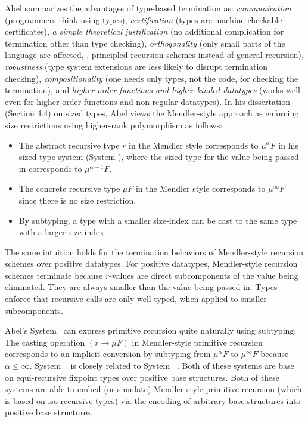 Abel \cite{abel06phd,Abel12talkFICS} summarizes the advantages of
type-based termination as:
\emph{communication} (programmers think using types),
\emph{certification} (types are machine-checkable certificates),
\emph{a simple theoretical justification}
        (no additional complication for termination other than type checking),
\emph{orthogonality} (only small parts of the language are affected,
        \eg, principled recursion schemes instead of general recursion),
\emph{robustness} (type system extensions are less likely to
                        disrupt termination checking),
\emph{compositionality}
        (one needs only types, not the code, for checking the termination), and
\emph{higher-order functions and higher-kinded datatypes}
        (works well even for higher-order functions and non-regular datatypes).
In his dissertation \cite{abel06phd} (Section 4.4) on sized types,
Abel views the Mendler-style approach as enforcing size restrictions
using higher-rank polymorphism as follows:
\begin{itemize}
\item The abstract recursive type $r$ in the Mendler style corresponds to
        $\mu^\alpha F$ in his sized-type system (System \Fwhat),
        where the sized type
        for the value being passed in corresponds to $\mu^{\alpha+1} F$.
\item The concrete recursive type $\mu F$ in the Mendler style corresponds to
        $\mu^\infty F$ since there is no size restriction.
\item By subtyping, a type with a smaller size-index can be cast to
        the same type with a larger size-index.
\end{itemize}
The same intuition holds for the termination behaviors
of Mendler-style recursion schemes over positive datatypes.
For positive datatypes, Mendler-style recursion schemes terminate
because $r$-values are direct subcomponents of the value being eliminated.
They are always smaller than the value being passed in.
Types enforce that recursive calls are only well-typed,
when applied to smaller subcomponents.

Abel's System \Fwhat\ can express primitive recursion quite naturally
using subtyping. The casting operation $(r \to \mu F)$ in Mendler-style
primitive recursion corresponds to an implicit conversion by subtyping
from $\mu^\alpha F$ to $\mu^\infty F$ because $\alpha \leq \infty$.
System \Fwhat\ \cite{abel06phd} is closely related to
System \Fixw\ \cite{AbeMat04}. Both of these systems are base on
equi-recursive fixpoint types over positive base structures.
Both of these systems are able to embed (or simulate) Mendler-style
primitive recursion (which is based on iso-recursive types) via
the encoding \cite{Geu92} of arbitrary base structures into
positive base structures.

